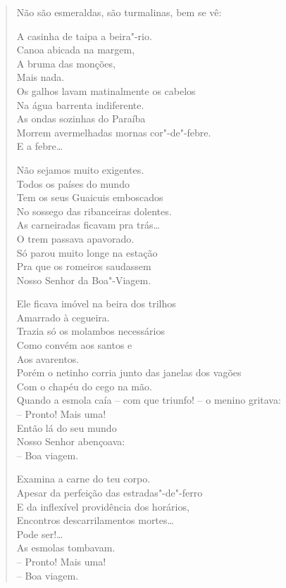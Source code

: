 \begin{verse}
Não são esmeraldas, são turmalinas, bem se vê:

A casinha de taipa a beira"-rio.\\
Canoa abicada na margem,\\
A bruma das monções,\\
Mais nada.\\
Os galhos lavam matinalmente os cabelos\\
Na água barrenta indiferente.\\
As ondas sozinhas do Paraíba\\
Morrem avermelhadas mornas cor"-de"-febre.\\
E a febre\ldots{}

Não sejamos muito exigentes.\\
Todos os países do mundo\\
Tem os seus Guaicuis emboscados\\
No sossego das ribanceiras dolentes.\\
As carneiradas ficavam pra trás\ldots{}\\
O trem passava apavorado.\\
Só parou muito longe na estação\\
Pra que os romeiros saudassem\\
Nosso Senhor da Boa"-Viagem.

Ele ficava imóvel na beira dos trilhos\\
Amarrado à cegueira.\\
Trazia só os molambos necessários\\
Como convém aos santos e\\
Aos avarentos.\\
Porém o netinho corria junto das janelas dos vagões\\
Com o chapéu do cego na mão.\\
Quando a esmola caía -- com que triunfo! -- o menino gritava:\\
-- Pronto! Mais uma!\\
Então lá do seu mundo\\
Nosso Senhor abençoava:\\
-- Boa viagem.

Examina a carne do teu corpo.\\
Apesar da perfeição das estradas"-de"-ferro\\
E da inflexível providência dos horários,\\
Encontros descarrilamentos mortes\ldots{}\\
Pode ser!\ldots{}\\
As esmolas tombavam.\\
-- Pronto! Mais uma!\\
-- Boa viagem.


\end{verse}
